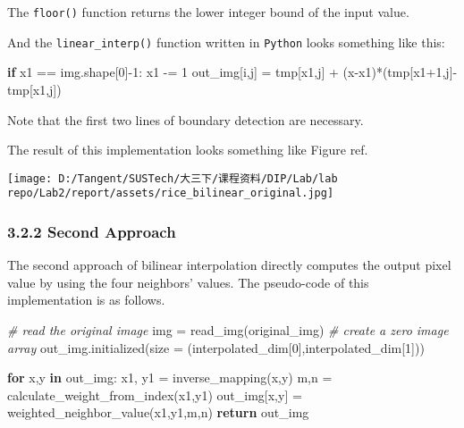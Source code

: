 \documentclass[
]{article}
\newenvironment{Shaded}{}{}
\newcommand{\CommentTok}[1]{\textcolor[rgb]{0.38,0.63,0.69}{\textit{#1}}}
\newcommand{\ControlFlowTok}[1]{\textcolor[rgb]{0.00,0.44,0.13}{\textbf{#1}}}
\newcommand{\DecValTok}[1]{\textcolor[rgb]{0.25,0.63,0.44}{#1}}
\newcommand{\KeywordTok}[1]{\textcolor[rgb]{0.00,0.44,0.13}{\textbf{#1}}}
\newcommand{\NormalTok}[1]{#1}
\newcommand{\OperatorTok}[1]{\textcolor[rgb]{0.40,0.40,0.40}{#1}}
\begin{document}
The \texttt{floor()} function returns the lower integer bound of the
input value.

And the \texttt{linear\_interp()} function written in \texttt{Python}
looks something like this:

\begin{Shaded}
\begin{Highlighting}[]
\ControlFlowTok{if}\NormalTok{ x1 }\OperatorTok{==}\NormalTok{ img.shape[}\DecValTok{0}\NormalTok{]}\OperatorTok{{-}}\DecValTok{1}\NormalTok{:}
\NormalTok{    x1 }\OperatorTok{{-}=} \DecValTok{1}
\NormalTok{out\_img[i,j] }\OperatorTok{=}\NormalTok{ tmp[x1,j] }\OperatorTok{+}\NormalTok{ (x}\OperatorTok{{-}}\NormalTok{x1)}\OperatorTok{*}\NormalTok{(tmp[x1}\OperatorTok{+}\DecValTok{1}\NormalTok{,j]}\OperatorTok{{-}}\NormalTok{tmp[x1,j])}
\end{Highlighting}
\end{Shaded}

Note that the first two lines of boundary detection are necessary.

The result of this implementation looks something like Figure ref.

\texttt{[image: D:/Tangent/SUSTech/大三下/课程资料/DIP/Lab/lab repo/Lab2/report/assets/rice\_bilinear\_original.jpg]}

\hypertarget{322-second-approach}{%
\subsubsection{3.2.2 Second Approach}\label{322-second-approach}}

The second approach of bilinear interpolation directly computes the
output pixel value by using the four neighbors' values. The pseudo-code
of this implementation is as follows.

\begin{Shaded}
\begin{Highlighting}[]
\CommentTok{\# read the original image}
\NormalTok{img }\OperatorTok{=}\NormalTok{ read\_img(original\_img)}
\CommentTok{\# create a zero image array}
\NormalTok{out\_img.initialized(size }\OperatorTok{=}\NormalTok{ (interpolated\_dim[}\DecValTok{0}\NormalTok{],interpolated\_dim[}\DecValTok{1}\NormalTok{]))}

\ControlFlowTok{for}\NormalTok{ x,y }\KeywordTok{in}\NormalTok{ out\_img:}
\NormalTok{    x1, y1 }\OperatorTok{=}\NormalTok{ inverse\_mapping(x,y)}
\NormalTok{    m,n }\OperatorTok{=}\NormalTok{ calculate\_weight\_from\_index(x1,y1)}
\NormalTok{    out\_img[x,y] }\OperatorTok{=}\NormalTok{ weighted\_neighbor\_value(x1,y1,m,n)}
\ControlFlowTok{return}\NormalTok{ out\_img}
\end{Highlighting}
\end{Shaded}
\end{document}
